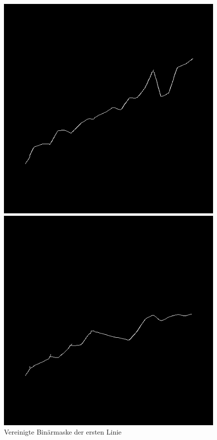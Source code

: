 \begin{figure}[H] %
    \centering
    \begin{minipage}{0.315\textwidth} %
        \centering
        \includegraphics[width=\linewidth]{Implementation/img/alg_layer1_processed.png}
        \caption{ Vereinigte Binärmaske der ersten Linie}
        \label{fig:alg_layer1_processed}
    \end{minipage}\hfill %
    \begin{minipage}{0.315\textwidth} %
        \centering
        \includegraphics[width=\linewidth]{Implementation/img/alg_layer2_processed.png}

\end{minipage}
\end{figure}
